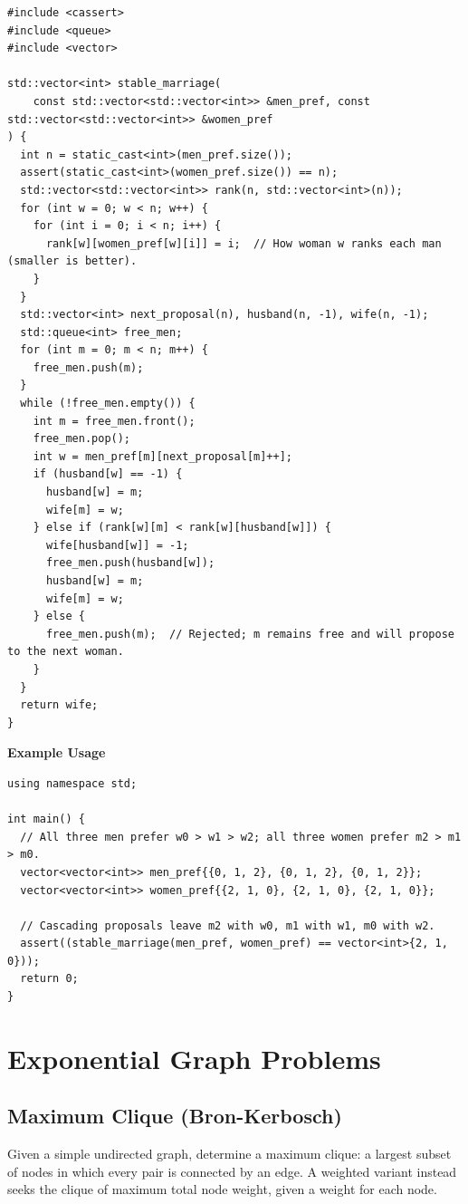 \begin{lstlisting}[style=cpp]
#include <cassert>
#include <queue>
#include <vector>

std::vector<int> stable_marriage(
    const std::vector<std::vector<int>> &men_pref, const std::vector<std::vector<int>> &women_pref
) {
  int n = static_cast<int>(men_pref.size());
  assert(static_cast<int>(women_pref.size()) == n);
  std::vector<std::vector<int>> rank(n, std::vector<int>(n));
  for (int w = 0; w < n; w++) {
    for (int i = 0; i < n; i++) {
      rank[w][women_pref[w][i]] = i;  // How woman w ranks each man (smaller is better).
    }
  }
  std::vector<int> next_proposal(n), husband(n, -1), wife(n, -1);
  std::queue<int> free_men;
  for (int m = 0; m < n; m++) {
    free_men.push(m);
  }
  while (!free_men.empty()) {
    int m = free_men.front();
    free_men.pop();
    int w = men_pref[m][next_proposal[m]++];
    if (husband[w] == -1) {
      husband[w] = m;
      wife[m] = w;
    } else if (rank[w][m] < rank[w][husband[w]]) {
      wife[husband[w]] = -1;
      free_men.push(husband[w]);
      husband[w] = m;
      wife[m] = w;
    } else {
      free_men.push(m);  // Rejected; m remains free and will propose to the next woman.
    }
  }
  return wife;
}
\end{lstlisting}
\textbf{Example Usage}\par
\begin{lstlisting}[style=cpp]
using namespace std;

int main() {
  // All three men prefer w0 > w1 > w2; all three women prefer m2 > m1 > m0.
  vector<vector<int>> men_pref{{0, 1, 2}, {0, 1, 2}, {0, 1, 2}};
  vector<vector<int>> women_pref{{2, 1, 0}, {2, 1, 0}, {2, 1, 0}};

  // Cascading proposals leave m2 with w0, m1 with w1, m0 with w2.
  assert((stable_marriage(men_pref, women_pref) == vector<int>{2, 1, 0}));
  return 0;
}
\end{lstlisting}

\section{\texorpdfstring{Exponential Graph Problems}{4.7 Exponential Graph Problems}}
\setcounter{section}{7}
\setcounter{subsection}{0}
\subsection{Maximum Clique (Bron-Kerbosch)}
\label{sec:4.7.1}
Given a simple undirected graph, determine a maximum clique: a largest subset of nodes in which every pair is connected by an edge. A weighted variant instead seeks the clique of maximum total node weight, given a weight for each node.

